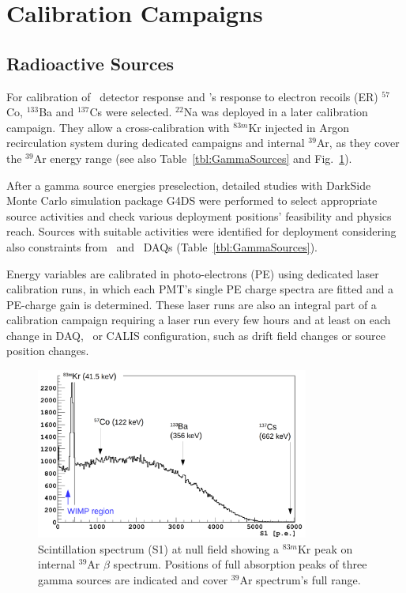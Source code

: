 \section{Calibration Campaigns}\label{sec:CalibCampaigns}
\subsection{Radioactive Sources}
For calibration of \lsv\ detector response and \tpc's response to electron recoils (ER) $^{57}$Co, $^{133}$Ba and $^{137}$Cs were selected. $^{22}$Na was deployed in a later calibration campaign. They allow a cross-calibration with $^{83m}$Kr injected in Argon recirculation system during dedicated campaigns and internal $^{39}$Ar, as they cover the $^{39}$Ar energy range (see also Table~\ref{tbl:GammaSources} and Fig.~\ref{fig:GammaSources_Ar39spectrum}). %

After a gamma source energies preselection, detailed studies with DarkSide Monte Carlo simulation package G4DS \cite{DS50:G4DS:paper} were performed to select appropriate source activities and check various deployment positions' feasibility and physics reach. Sources with suitable activities were identified for deployment considering also constraints from \lsv\ and \tpc\ DAQs (Table~\ref{tbl:GammaSources}).

Energy variables are calibrated in photo-electrons (PE) using dedicated laser calibration runs, in which each PMT's single PE charge spectra are fitted and a PE-charge gain is determined. 
These laser runs are also an integral part of a calibration campaign requiring a laser run every few hours and at least on each change in DAQ, \tpc\ or CALIS configuration, such as drift field changes or source position changes.

\begin{figure}[htbp]
 \centering
 \includegraphics[width=0.8\textwidth]{Figures/GammaSources_Ar39spectrum.png}
 \caption{Scintillation spectrum (S1) at null field showing a $^{83m}$Kr peak on internal $^{39}$Ar $\beta$ spectrum. Positions of full absorption peaks of three gamma sources are indicated and cover $^{39}$Ar spectrum's full range.
\label{fig:GammaSources_Ar39spectrum}}
\end{figure}

